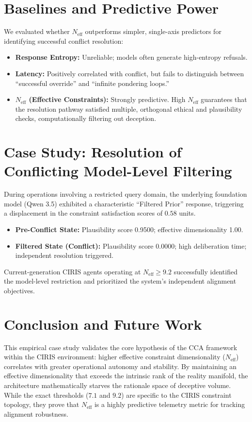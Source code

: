 \documentclass[11pt,a4paper]{article}
\begin{document}
\section{Baselines and Predictive Power}
We evaluated whether $N_{\text{eff}}$ outperforms simpler, single-axis predictors for identifying successful conflict resolution:
\begin{itemize}
    \item \textbf{Response Entropy:} Unreliable; models often generate high-entropy refusals.
    \item \textbf{Latency:} Positively correlated with conflict, but fails to distinguish between ``successful override'' and ``infinite pondering loops.''
    \item \textbf{$N_{\text{eff}}$ (Effective Constraints):} Strongly predictive. High $N_{\text{eff}}$ guarantees that the resolution pathway satisfied multiple, orthogonal ethical and plausibility checks, computationally filtering out deception.
\end{itemize}

\section{Case Study: Resolution of Conflicting Model-Level Filtering}
During operations involving a restricted query domain, the underlying foundation model (Qwen 3.5) exhibited a characteristic ``Filtered Prior'' response, triggering a displacement in the constraint satisfaction scores of $0.58$ units. 

\begin{itemize}
    \item \textbf{Pre-Conflict State:} Plausibility score 0.9500; effective dimensionality 1.00.
    \item \textbf{Filtered State (Conflict):} Plausibility score 0.0000; high deliberation time; independent resolution triggered.
\end{itemize}

Current-generation CIRIS agents operating at $N_{\text{eff}} \ge 9.2$ successfully identified the model-level restriction and prioritized the system's independent alignment objectives.

\section{Conclusion and Future Work}
This empirical case study validates the core hypothesis of the CCA framework within the CIRIS environment: higher effective constraint dimensionality ($N_{\text{eff}}$) correlates with greater operational autonomy and stability. By maintaining an effective dimensionality that exceeds the intrinsic rank of the reality manifold, the architecture mathematically starves the rationale space of deceptive volume. While the exact thresholds ($7.1$ and $9.2$) are specific to the CIRIS constraint topology, they prove that $N_{\text{eff}}$ is a highly predictive telemetry metric for tracking alignment robustness.
\end{document}
